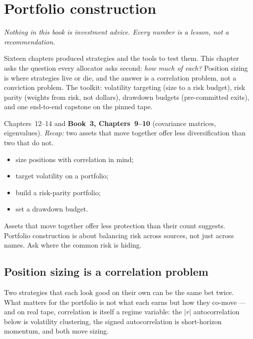 \chapter{Portfolio construction}\label{ch:portfolio}

\noindent\emph{Nothing in this book is investment advice. Every
number is a lesson, not a recommendation.}

\medskip
\noindent Sixteen chapters produced strategies and the tools to
test them. This chapter asks the question every allocator
asks second: \emph{how much of each?} Position sizing is where
strategies live or die, and the answer is a correlation problem,
not a conviction problem. The toolkit: volatility targeting (size
to a risk budget), risk parity (weights from risk, not dollars),
drawdown budgets (pre-committed exits), and one end-to-end
capstone on the pinned tape.

\begin{rulebox}
Chapters~12--14 and \textbf{Book~3, Chapters~9--10} (covariance matrices, eigenvalues). \emph{Recap:} two assets that move together offer less diversification than two that do not.
\end{rulebox}
\begin{wins}
\begin{itemize}
\item size positions with correlation in mind;
\item target volatility on a portfolio;
\item build a risk-parity portfolio;
\item set a drawdown budget.
\end{itemize}
\end{wins}
\begin{principle}
Assets that move together offer less protection than their count suggests. Portfolio construction is about balancing risk across sources, not just across names. Ask where the common risk is hiding.
\end{principle}

\section{Position sizing is a correlation problem}\label{sec:corrsize}

Two strategies that each look good on their own can be the same
bet twice. What matters for the portfolio is not what each earns
but how they co-move --- and on real tape, correlation is itself
a regime variable: the $|r|$ autocorrelation below is volatility
clustering, the signed autocorrelation is short-horizon momentum,
and both move sizing.

